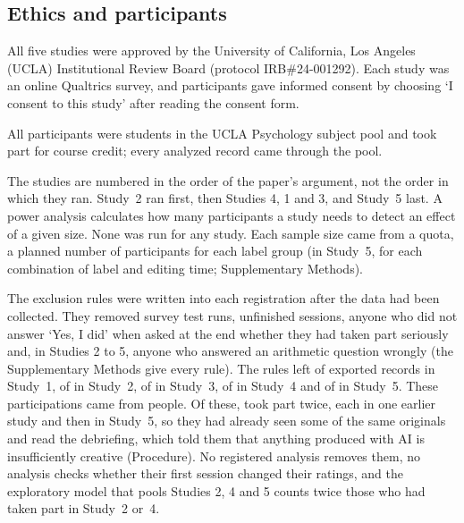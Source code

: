 
\subsection*{Ethics and participants}

All five studies were approved by the University of California, Los Angeles (UCLA) Institutional Review Board (protocol IRB\#24-001292). Each study was an online Qualtrics survey, and participants gave informed consent by choosing `I consent to this study' after reading the consent form.

All participants were students in the UCLA Psychology subject pool and took part for course credit; every analyzed record came through the pool.

The studies are numbered in the order of the paper's argument, not the order in which they ran. Study~2 ran first, then Studies 4, 1 and 3, and Study~5 last. A power analysis calculates how many participants a study needs to detect an effect of a given size. None was run for any study. Each sample size came from a quota, a planned number of participants for each label group (in Study~5, for each combination of label and editing time; Supplementary Methods).

The exclusion rules were written into each registration after the data had been collected. They removed survey test runs, unfinished sessions, anyone who did not answer `Yes, I did' when asked at the end whether they had taken part seriously and, in Studies 2 to 5, anyone who answered an arithmetic question wrongly (the Supplementary Methods give every rule). The rules left \SOneN{} of \SOneNRecords{} exported records in Study~1, \STwoN{} of \STwoNRecords{} in Study~2, \SThreeN{} of \SThreeNRecords{} in Study~3, \SFourN{} of \SFourNRecords{} in Study~4 and \SFiveN{} of \SFiveNRecords{} in Study~5. These \NTotal{} participations came from \NPeople{} people. Of these, \NPeopleRepeat{} took part twice, each in one earlier study and then in Study~5, so they had already seen some of the same originals and read the debriefing, which told them that anything produced with AI is insufficiently creative (Procedure). No registered analysis removes them, no analysis checks whether their first session changed their ratings, and the exploratory model that pools Studies 2, 4 and 5 counts twice those who had taken part in Study~2 or~4.


